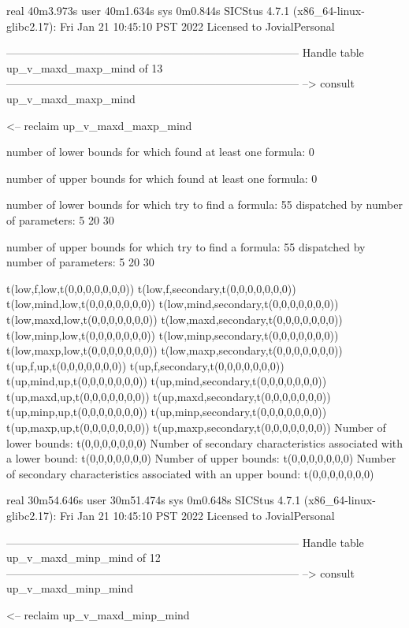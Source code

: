real	40m3.973s
user	40m1.634s
sys	0m0.844s
SICStus 4.7.1 (x86_64-linux-glibc2.17): Fri Jan 21 10:45:10 PST 2022
Licensed to JovialPersonal


--------------------------------------------------------------------------------
Handle table up_v_maxd_maxp_mind of 13
--------------------------------------------------------------------------------
--> consult up_v_maxd_maxp_mind

<-- reclaim up_v_maxd_maxp_mind

number of lower bounds for which found at least one formula: 0

number of upper bounds for which found at least one formula: 0

number of lower bounds for which try to find a formula: 55
dispatched by number of parameters: 5  20  30

number of upper bounds for which try to find a formula: 55
dispatched by number of parameters: 5  20  30

t(low,f,low,t(0,0,0,0,0,0,0))
t(low,f,secondary,t(0,0,0,0,0,0,0))
t(low,mind,low,t(0,0,0,0,0,0,0))
t(low,mind,secondary,t(0,0,0,0,0,0,0))
t(low,maxd,low,t(0,0,0,0,0,0,0))
t(low,maxd,secondary,t(0,0,0,0,0,0,0))
t(low,minp,low,t(0,0,0,0,0,0,0))
t(low,minp,secondary,t(0,0,0,0,0,0,0))
t(low,maxp,low,t(0,0,0,0,0,0,0))
t(low,maxp,secondary,t(0,0,0,0,0,0,0))
t(up,f,up,t(0,0,0,0,0,0,0))
t(up,f,secondary,t(0,0,0,0,0,0,0))
t(up,mind,up,t(0,0,0,0,0,0,0))
t(up,mind,secondary,t(0,0,0,0,0,0,0))
t(up,maxd,up,t(0,0,0,0,0,0,0))
t(up,maxd,secondary,t(0,0,0,0,0,0,0))
t(up,minp,up,t(0,0,0,0,0,0,0))
t(up,minp,secondary,t(0,0,0,0,0,0,0))
t(up,maxp,up,t(0,0,0,0,0,0,0))
t(up,maxp,secondary,t(0,0,0,0,0,0,0))
Number of lower bounds:                                             t(0,0,0,0,0,0,0)
Number of secondary characteristics associated with a lower bound:  t(0,0,0,0,0,0,0)
Number of upper bounds:                                             t(0,0,0,0,0,0,0)
Number of secondary characteristics associated with an upper bound: t(0,0,0,0,0,0,0)

real	30m54.646s
user	30m51.474s
sys	0m0.648s
SICStus 4.7.1 (x86_64-linux-glibc2.17): Fri Jan 21 10:45:10 PST 2022
Licensed to JovialPersonal


--------------------------------------------------------------------------------
Handle table up_v_maxd_minp_mind of 12
--------------------------------------------------------------------------------
--> consult up_v_maxd_minp_mind

<-- reclaim up_v_maxd_minp_mind

